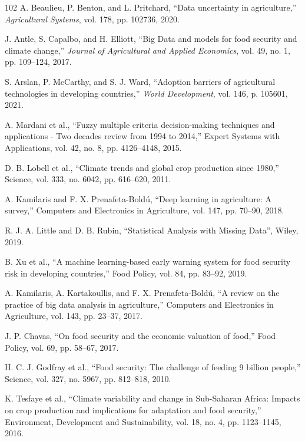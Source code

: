 \documentclass[preprint,12pt]{elsarticle}
\begin{document}
\begin{thebibliography}{102}
		A. Beaulieu, P. Benton, and L. Pritchard, ``Data uncertainty in agriculture,'' \emph{Agricultural Systems}, vol. 178, pp. 102736, 2020.
		
		J. Antle, S. Capalbo, and H. Elliott, ``Big Data and models for food security and climate change,'' \emph{Journal of Agricultural and Applied Economics}, vol. 49, no. 1, pp. 109--124, 2017.
		
		S. Arslan, P. McCarthy, and S. J. Ward, ``Adoption barriers of agricultural technologies in developing countries,'' \emph{World Development}, vol. 146, p. 105601, 2021.
		
		A. Mardani et al., ``Fuzzy multiple criteria decision-making techniques and applications - Two decades review from 1994 to 2014,'' Expert Systems with Applications, vol. 42, no. 8, pp. 4126--4148, 2015.
		
		D. B. Lobell et al., ``Climate trends and global crop production since 1980,'' Science, vol. 333, no. 6042, pp. 616--620, 2011.
		
		A. Kamilaris and F. X. Prenafeta-Boldú, ``Deep learning in agriculture: A survey,'' Computers and Electronics in Agriculture, vol. 147, pp. 70--90, 2018.
		
		R. J. A. Little and D. B. Rubin, ``Statistical Analysis with Missing Data'', Wiley, 2019.
		
		B. Xu et al., ``A machine learning-based early warning system for food security risk in developing countries,'' Food Policy, vol. 84, pp. 83--92, 2019.
		
		A. Kamilaris, A. Kartakoullis, and F. X. Prenafeta-Boldú, ``A review on the practice of big data analysis in agriculture,'' Computers and Electronics in Agriculture, vol. 143, pp. 23--37, 2017.
		
		J. P. Chavas, ``On food security and the economic valuation of food,'' Food Policy, vol. 69, pp. 58--67, 2017.
		
		H. C. J. Godfray et al., ``Food security: The challenge of feeding 9 billion people,'' Science, vol. 327, no. 5967, pp. 812--818, 2010.
		
		K. Tesfaye et al., ``Climate variability and change in Sub-Saharan Africa: Impacts on crop production and implications for adaptation and food security,'' Environment, Development and Sustainability, vol. 18, no. 4, pp. 1123--1145, 2016.
	\end{thebibliography}
	
	
	
\end{document}

